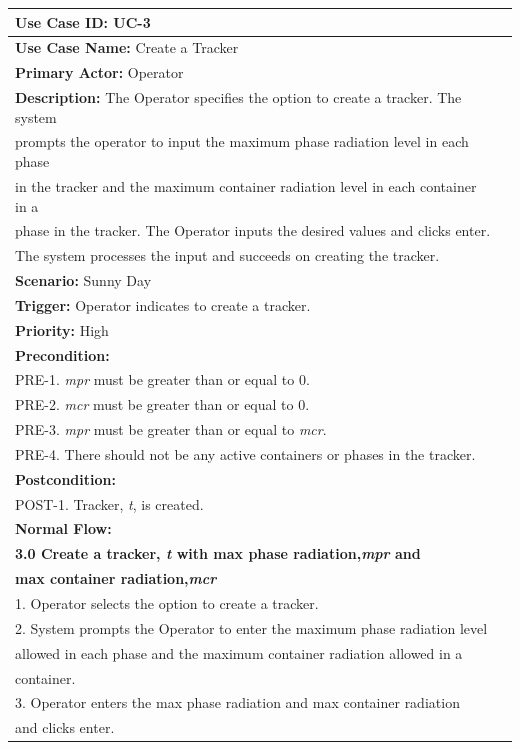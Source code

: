 \begin{table}[h]
\begin{center}
\begin{tabular}{|l|l|}
\hline
\textbf{Use Case ID:} UC-3 \\ \hline
\textbf{Use Case Name:} Create a Tracker \\ \hline
\textbf {Primary Actor:} Operator \\ \hline
\textbf{Description:} The Operator specifies the option to create a tracker. The system \\prompts the operator to input the maximum phase radiation level in each phase \\in the tracker and the maximum container radiation level in each container in a \\phase in the tracker. The Operator inputs the desired values and clicks enter. \\The system processes the input and succeeds on creating the tracker. \\ \hline
\textbf{Scenario:} Sunny Day \\ \hline
\textbf{Trigger:} Operator indicates to create a tracker.\\ \hline
\textbf{Priority:} High \\ \hline
\textbf{Precondition:}
\\ PRE-1. \emph{mpr} must be greater than or equal to 0.
\\ PRE-2. \emph{mcr} must be greater than or equal to 0.
\\ PRE-3. \emph{mpr} must be greater than or equal to \emph{mcr}.
\\ PRE-4. There should not be any active containers or phases in the tracker. \\ \hline
\textbf{Postcondition:}
\\ POST-1. Tracker, \emph{t}, is created. \\ \hline
\textbf{Normal Flow:} 
\\ \textbf{3.0 Create a tracker, \emph{t} with max phase radiation,\emph{mpr} and}
\\ \textbf{max container radiation,\emph{mcr}}
\\ 1. Operator selects the option to create a tracker.
\\ 2. System prompts the Operator to enter the maximum phase radiation level \\allowed in each phase and the maximum container radiation allowed in a \\container.
\\ 3. Operator enters the max phase radiation and max container radiation \\and clicks enter.

\end{tabular}
\end{center}
\end{table}
